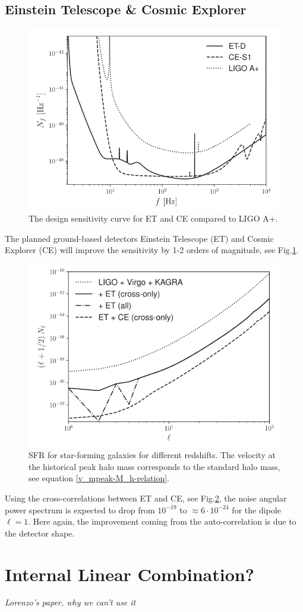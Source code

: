 \subsection{Einstein Telescope \& Cosmic Explorer}
\begin{figure}[h]
    \centering
    \includegraphics[width=0.7\linewidth]{Images/ET_CE_frequency_noise.png}
    \caption{The design sensitivity curve for ET and CE compared to LIGO A+.}
    \label{ET_sensitivity}
\end{figure} 

The planned ground-based detectors Einstein Telescope (ET) and Cosmic Explorer (CE) will improve the sensitivity by 1-2 orders of magnitude, see Fig.\ref{ET_sensitivity}.

\begin{figure}[h]
    \centering
    \includegraphics[width=0.7\linewidth]{Images/et_ce_Cl_noise.png}
    \caption{SFR for star-forming galaxies for different redshifts. The velocity at the historical peak halo mass corresponds to the standard halo mass, see equation \ref{v_mpeak-M_h-relation}.}
    \label{ET_Cl}
\end{figure} 

Using the cross-correlations between ET and CE, see Fig.\ref{ET_Cl}, the noise angular power spectrum is expected to drop from $10^{-19}$ to $\approx 6\cdot 10^{-24}$ for the dipole $\ell =1$. Here again, the improvement coming from the auto-correlation is due to the detector shape.


\section{Internal Linear Combination?}
\textit{Lorenzo's paper, why we can't use it}